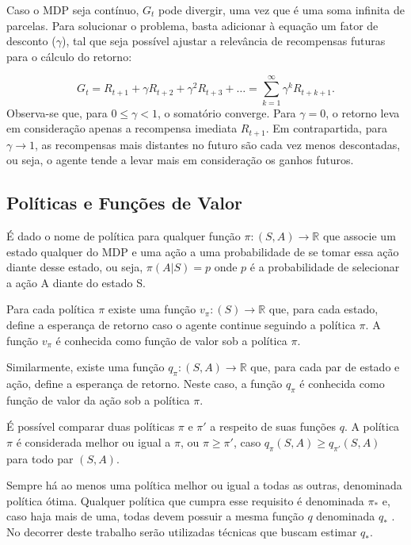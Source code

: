 Caso o MDP seja contínuo, $G_t$ pode divergir, uma vez que é uma soma infinita de parcelas. Para solucionar o problema, basta adicionar à equação um fator de desconto ($\gamma$), tal que seja possível ajustar a relevância de recompensas futuras para o cálculo do retorno:

\begin{equation}
	G_{t} = R_{t+1} + \gamma R_{t+2} + \gamma^2 R_{t+3} + \dotsc = \sum_{k=1}^{\infty} \gamma^k R_{t+k+1}.
\end{equation}
% 
Observa-se que, para $ 0 \leq \gamma < 1$, o somatório converge. Para $\gamma = 0$, o retorno leva em consideração apenas a recompensa imediata $R_{t+1}$. Em contrapartida, para $\gamma \to 1$, as recompensas mais distantes no futuro são cada vez menos descontadas, ou seja, o agente tende a levar mais em consideração os ganhos futuros.

\subsection{Políticas e Funções de Valor}
\label{subsec:policies}

É dado o nome de política para qualquer função $\pi: (S, A) \to \mathbb{R}$ que associe um estado qualquer do MDP e uma ação a uma probabilidade de se tomar essa ação diante desse estado, ou seja, $\pi(A|S) = p$ onde $p$ é a probabilidade de selecionar a ação A diante do estado S.

Para cada política $\pi$ existe uma função $v_\pi: (S) \to \mathbb{R}$ que, para cada estado, define a esperança de retorno caso o agente continue seguindo a política $\pi$. A função $v_\pi$ é conhecida como função de valor sob a política $\pi$.

Similarmente, existe uma função $q_\pi: (S, A) \to \mathbb{R}$ que, para cada par de estado e ação, define a esperança de retorno. Neste caso, a função $q_\pi$ é conhecida como função de valor da ação sob a política $\pi$.

É possível comparar duas políticas $\pi$ e $\pi'$ a respeito de suas funções $q$. A política $\pi$ é considerada melhor ou igual a $\pi$, ou $\pi \ge \pi'$, caso $q_\pi(S, A) \ge q_{\pi'}(S, A)$ para todo par $(S, A)$.

Sempre há ao menos uma política melhor ou igual a todas as outras, denominada política ótima. Qualquer política que cumpra esse requisito é denominada $\pi_*$ e, caso haja mais de uma, todas devem possuir a mesma função $q$ denominada $q_*$ \cite{sutton2018reinforcement}. No decorrer deste trabalho serão utilizadas técnicas que buscam estimar $q_*$. %


